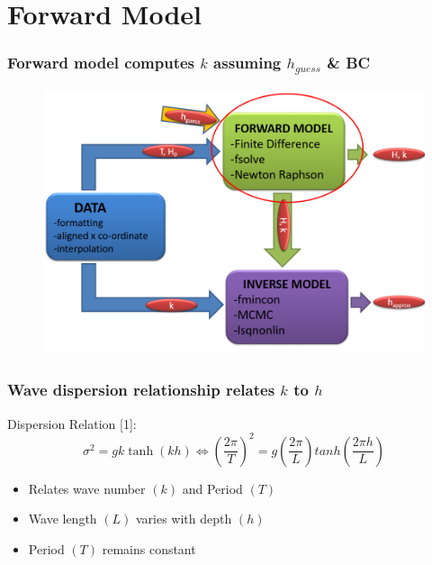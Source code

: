 \documentclass[7pt]{beamer}
\begin{document}
\section{Forward Model}

\begin{frame}
 	\frametitle{Forward model computes $k$ assuming $h_{guess}$ \& BC}
		\begin{figure}[H]
	 		\centering
	 		\includegraphics[width=1.0\linewidth]{img/Flow_New.png}
	 	\end{figure}
\end{frame}

\begin{frame}
	\frametitle{Wave dispersion relationship relates $k$ to $h$}
		Dispersion Relation [1]:
		$$ \sigma^2=gk\tanh(kh) \Longleftrightarrow \left(\frac{2\pi}{T}\right)^2 = g\left(\frac{2\pi}{L}\right) tanh \left(\frac{2\pi h}{L}\right)
		$$
		\begin{itemize}
			\item Relates wave number $(k)$ and Period $(T)$
			\item Wave length $(L)$ varies with depth $(h)$
			\item Period $(T)$ remains constant
		\end{itemize}
\end{frame}
\end{document}
